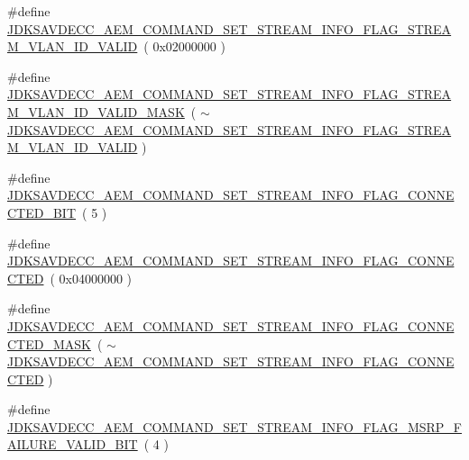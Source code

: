 \begin{DoxyCompactItemize}
\item 
\#define \hyperlink{group__command__set__stream__info_gaea57b1e202c105ddca91ec6eba39eb4c}{J\+D\+K\+S\+A\+V\+D\+E\+C\+C\+\_\+\+A\+E\+M\+\_\+\+C\+O\+M\+M\+A\+N\+D\+\_\+\+S\+E\+T\+\_\+\+S\+T\+R\+E\+A\+M\+\_\+\+I\+N\+F\+O\+\_\+\+F\+L\+A\+G\+\_\+\+S\+T\+R\+E\+A\+M\+\_\+\+V\+L\+A\+N\+\_\+\+I\+D\+\_\+\+V\+A\+L\+ID}~( 0x02000000 )
\item 
\#define \hyperlink{group__command__set__stream__info_ga1fcb6fb4979a6f7741e07ca672add640}{J\+D\+K\+S\+A\+V\+D\+E\+C\+C\+\_\+\+A\+E\+M\+\_\+\+C\+O\+M\+M\+A\+N\+D\+\_\+\+S\+E\+T\+\_\+\+S\+T\+R\+E\+A\+M\+\_\+\+I\+N\+F\+O\+\_\+\+F\+L\+A\+G\+\_\+\+S\+T\+R\+E\+A\+M\+\_\+\+V\+L\+A\+N\+\_\+\+I\+D\+\_\+\+V\+A\+L\+I\+D\+\_\+\+M\+A\+SK}~( $\sim$\hyperlink{group__command__set__stream__info_gaea57b1e202c105ddca91ec6eba39eb4c}{J\+D\+K\+S\+A\+V\+D\+E\+C\+C\+\_\+\+A\+E\+M\+\_\+\+C\+O\+M\+M\+A\+N\+D\+\_\+\+S\+E\+T\+\_\+\+S\+T\+R\+E\+A\+M\+\_\+\+I\+N\+F\+O\+\_\+\+F\+L\+A\+G\+\_\+\+S\+T\+R\+E\+A\+M\+\_\+\+V\+L\+A\+N\+\_\+\+I\+D\+\_\+\+V\+A\+L\+ID} )
\item 
\#define \hyperlink{group__command__set__stream__info_ga76d87ebbc30523da1f2c0ceb6c9dd13f}{J\+D\+K\+S\+A\+V\+D\+E\+C\+C\+\_\+\+A\+E\+M\+\_\+\+C\+O\+M\+M\+A\+N\+D\+\_\+\+S\+E\+T\+\_\+\+S\+T\+R\+E\+A\+M\+\_\+\+I\+N\+F\+O\+\_\+\+F\+L\+A\+G\+\_\+\+C\+O\+N\+N\+E\+C\+T\+E\+D\+\_\+\+B\+IT}~( 5 )
\item 
\#define \hyperlink{group__command__set__stream__info_ga621867bc1cb90adcde90d615fea5d8df}{J\+D\+K\+S\+A\+V\+D\+E\+C\+C\+\_\+\+A\+E\+M\+\_\+\+C\+O\+M\+M\+A\+N\+D\+\_\+\+S\+E\+T\+\_\+\+S\+T\+R\+E\+A\+M\+\_\+\+I\+N\+F\+O\+\_\+\+F\+L\+A\+G\+\_\+\+C\+O\+N\+N\+E\+C\+T\+ED}~( 0x04000000 )
\item 
\#define \hyperlink{group__command__set__stream__info_gacfa8bcd548405aa5ead8be415a70b824}{J\+D\+K\+S\+A\+V\+D\+E\+C\+C\+\_\+\+A\+E\+M\+\_\+\+C\+O\+M\+M\+A\+N\+D\+\_\+\+S\+E\+T\+\_\+\+S\+T\+R\+E\+A\+M\+\_\+\+I\+N\+F\+O\+\_\+\+F\+L\+A\+G\+\_\+\+C\+O\+N\+N\+E\+C\+T\+E\+D\+\_\+\+M\+A\+SK}~( $\sim$\hyperlink{group__command__set__stream__info_ga621867bc1cb90adcde90d615fea5d8df}{J\+D\+K\+S\+A\+V\+D\+E\+C\+C\+\_\+\+A\+E\+M\+\_\+\+C\+O\+M\+M\+A\+N\+D\+\_\+\+S\+E\+T\+\_\+\+S\+T\+R\+E\+A\+M\+\_\+\+I\+N\+F\+O\+\_\+\+F\+L\+A\+G\+\_\+\+C\+O\+N\+N\+E\+C\+T\+ED} )
\item 
\#define \hyperlink{group__command__set__stream__info_ga2bbd95712ba8a97b879c35a620e95768}{J\+D\+K\+S\+A\+V\+D\+E\+C\+C\+\_\+\+A\+E\+M\+\_\+\+C\+O\+M\+M\+A\+N\+D\+\_\+\+S\+E\+T\+\_\+\+S\+T\+R\+E\+A\+M\+\_\+\+I\+N\+F\+O\+\_\+\+F\+L\+A\+G\+\_\+\+M\+S\+R\+P\+\_\+\+F\+A\+I\+L\+U\+R\+E\+\_\+\+V\+A\+L\+I\+D\+\_\+\+B\+IT}~( 4 )

\end{DoxyCompactItemize}
